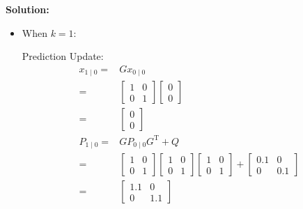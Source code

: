 \documentclass[twoside]{article}
\renewcommand{\t}{^\mathrm{T}{}}
\begin{document}
\textbf{Solution:} 
\begin{itemize}
	\item When $k = 1$:
	
	Prediction Update:
	\begin{align*}
		x_{1\mid 0} =& G x_{0\mid 0}\\
		=& \left[ \begin{array}{cc}
			1 & 0 \\ 0 & 1
		\end{array}\right] \left[ \begin{array}{c}
		0 \\ 0
	\end{array}\right] \\
		=&\left[ \begin{array}{c}
			0 \\ 0
		\end{array}\right] \\
		P_{1\mid 0} =& G P_{0\mid 0} G\t + Q\\
		=& \left[ \begin{array}{cc}
			1 & 0 \\ 0 & 1
		\end{array}\right]\left[ \begin{array}{cc}
		1 & 0 \\ 0 & 1
	\end{array}\right]\left[ \begin{array}{cc}
	1 & 0 \\ 0 & 1
	\end{array}\right]+\left[ \begin{array}{cc}
	0.1 & 0 \\ 0 & 0.1
	\end{array}\right]\\
	=& \left[ \begin{array}{cc}
		1.1 & 0 \\ 0 & 1.1
	\end{array}\right]
	\end{align*}
	

\end{itemize}
\end{document}

